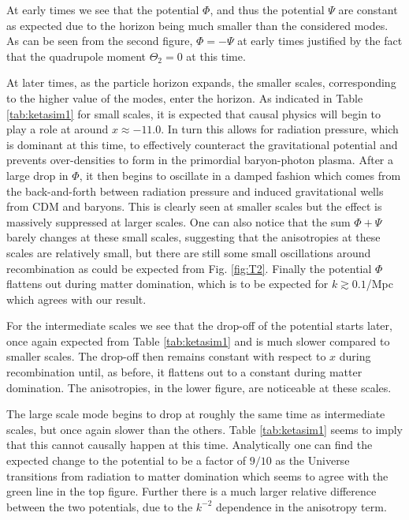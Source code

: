 \documentclass[%
reprint,
 amsmath,amssymb,
 aps,
]{revtex4-2}
\begin{document}
At early times we see that the potential $\Phi$, and thus the potential $\Psi$ are constant as expected due to the horizon being much smaller than the considered modes. As can be seen from the second figure, $\Phi=-\Psi$ at early times justified by the fact that the quadrupole moment $\Theta_2=0$ at this time.

At later times, as the particle horizon expands, the smaller scales, corresponding to the higher value of the modes, enter the horizon. As indicated in Table \ref{tab:ketasim1} for small scales, it is expected that causal physics will begin to play a role at around $x\approx -11.0$. In turn this allows for radiation pressure, which is dominant at this time, to effectively counteract the gravitational potential and prevents over-densities to form in the primordial baryon-photon plasma. After a large drop in $\Phi$, it then begins to oscillate in a damped fashion which comes from the back-and-forth between radiation pressure and induced gravitational wells from CDM and baryons. This is clearly seen at smaller scales but the effect is massively suppressed at larger scales. One can also notice that the sum $\Phi+\Psi$ barely changes at these small scales, suggesting that the anisotropies at these scales are relatively small, but there are still some small oscillations around recombination as could be expected from Fig. \ref{fig:T2}. Finally the potential $\Phi$ flattens out during matter domination, which is to be expected for $k\gtrsim0.1$/Mpc which agrees with our result. 

For the intermediate scales we see that the drop-off of the potential starts later, once again expected from Table \ref{tab:ketasim1} and is much slower compared to smaller scales. The drop-off then remains constant with respect to $x$ during recombination until, as before, it flattens out to a constant during matter domination. The anisotropies, in the lower figure, are noticeable at these scales. 

The large scale mode begins to drop at roughly the same time as intermediate scales, but once again slower than the others. Table \ref{tab:ketasim1} seems to imply that this cannot causally happen at this time. Analytically one can find the expected change to the potential to be a factor of $9/10$ as the Universe transitions from radiation to matter domination \cite{AST5220LectureNotes} which seems to agree with the green line in the top figure. Further there is a much larger relative difference between the two potentials, due to the $k^{-2}$ dependence in the anisotropy term.
\end{document}
